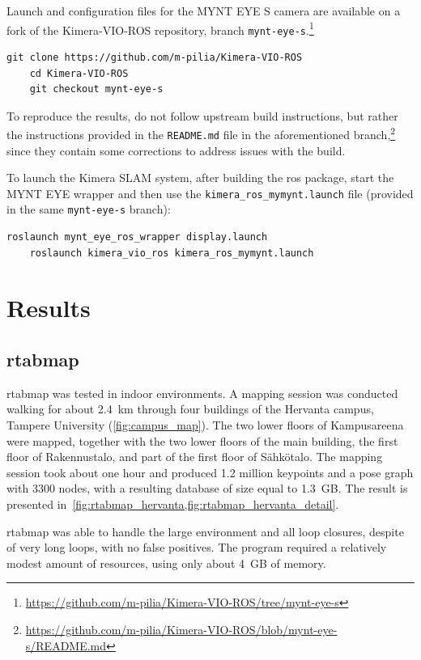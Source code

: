 \documentclass[11pt, letterpaper, twoside]{article}
\begin{document}
Launch and configuration files for the MYNT EYE S camera are available on a
fork of the Kimera-VIO-ROS repository, branch
\texttt{mynt-eye-s}.\footnote{\url{https://github.com/m-pilia/Kimera-VIO-ROS/tree/mynt-eye-s}}

\begin{Verbatim}[samepage=true]
    git clone https://github.com/m-pilia/Kimera-VIO-ROS
    cd Kimera-VIO-ROS
    git checkout mynt-eye-s
\end{Verbatim}

To reproduce the results, do not follow upstream build instructions, but rather
the instructions provided in the \texttt{README.md} file in the aforementioned
branch,\footnote{\url{https://github.com/m-pilia/Kimera-VIO-ROS/blob/mynt-eye-s/README.md}}
since they contain some corrections to address issues with the build.

To launch the Kimera SLAM system, after building the \gls{ros} package, start
the MYNT EYE wrapper and then use the \texttt{kimera\_ros\_mymynt.launch} file
(provided in the same \texttt{mynt-eye-s} branch):
\begin{Verbatim}[samepage=true]
    roslaunch mynt_eye_ros_wrapper display.launch
    roslaunch kimera_vio_ros kimera_ros_mymynt.launch
\end{Verbatim}

\section{Results}

\subsection{\acs{rtabmap}}

\gls{rtabmap} was tested in indoor environments. A mapping session was
conducted walking for about 2.4~km through four buildings of the Hervanta
campus, Tampere University (\cref{fig:campus_map}). The two lower floors of
Kampusareena were mapped, together with the two lower floors of the main
building, the first floor of Rakennustalo, and part of the first floor of
Sähkötalo. The mapping session took about one hour and produced 1.2 million
keypoints and a pose graph with 3300 nodes, with a resulting database of size
equal to 1.3~GB. The result is presented
in~\cref{fig:rtabmap_hervanta,fig:rtabmap_hervanta_detail}.

\gls{rtabmap} was able to handle the large environment and all loop closures,
despite of very long loops, with no false positives. The program required a
relatively modest amount of resources, using only about 4~GB of memory.
\end{document}
